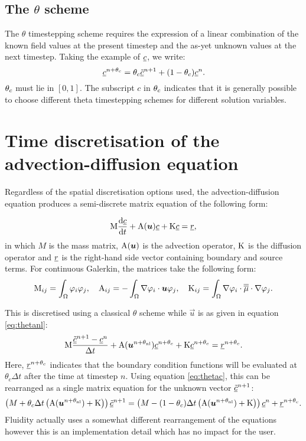 \subsection{The $\theta$ scheme}
\label{sect:ND_time_theta_scheme}

The $\theta$ timestepping scheme requires the expression of a linear
combination of the known field values at the present timestep and the as-yet
unknown values at the next timestep. Taking the example of $\underline{c}$, we write:
\begin{equation}
  \label{eq:thetac}
  \underline{c}^{n+\theta_c}=\theta_c\underline{\tilde c}^{n+1}+(1-\theta_c)\underline{c}^{n}.
\end{equation}
$\theta_c$ must lie in $[0,1]$. The subscript $c$ in $\theta_c$ indicates that it is 
generally possible to choose different theta timestepping schemes for different solution
variables.

\section{Time discretisation of the advection-diffusion equation}
\label{sect:ND_time_disct_adv_diff}

Regardless of the spatial discretisation options used, the
advection-diffusion equation produces a semi-discrete matrix equation of the
following form:

\begin{equation}
  \mathrm{M} \frac{\mathrm{d}\underline{c}}{\mathrm{d} t}+\mathrm{A}({\mbox{\boldmath$u$}})\underline{c}+\mathrm{K}\underline{c}=\underline{r},
\end{equation}
in which $M$ is the mass matrix, $\mathrm{A}({\mbox{\boldmath$u$}})$ is the advection
operator, $\mathrm{K}$ is the diffusion operator and $\underline{r}$ is the
right-hand side vector containing boundary and source terms. For continuous
Galerkin, the matrices take the following form:
\begin{equation}
  \mathrm{M}_{ij}=\int_\Omega \varphi_i\varphi_j, \quad
  \mathrm{A}_{ij}=-\int_\Omega \nabla\varphi_i\cdot{\mbox{\boldmath$u$}} \varphi_j, \quad
  \mathrm{K}_{ij}=\int_\Omega \nabla\varphi_i\cdot \overline{\overline{\mu}}\cdot\nabla \varphi_j.
\end{equation}

This is discretised using a classical $\theta$ scheme while $\vec u$ is as
given in equation \eqref{eq:thetanl}:
\begin{equation}
  \mathrm{M} \frac{\underline{\tilde c}^{n+1}-\underline{c}^{n}}{\Delta t}
  +\mathrm{A}({\mbox{\boldmath$u$}}^{n+\theta_{\mathrm{nl}}})\underline{c}^{n+\theta_c}+\mathrm{K}\underline{c}^{n+\theta_c}=\underline{r}^{n+\theta_c}.
\end{equation}
Here, $\underline{r}^{n+\theta_c}$ indicates that the boundary condition
functions will be evaluated at $\theta_c\Delta t$ after the time at timestep
$n$. Using equation \eqref{eq:thetac}, this can be rearranged as a single
matrix equation for the unknown vector $\underline{\tilde c}^{n+1}$:
\begin{equation}
  \left(M+\theta_c\Delta t\left(\mathrm{A}({\mbox{\boldmath$u$}}^{n+\theta_{\mathrm{nl}}})+\mathrm{K}\right)\right)\underline{\tilde c}^{n+1}
  =\left(M-(1-\theta_c)\Delta
    t\left(\mathrm{A}({\mbox{\boldmath$u$}}^{n+\theta_{\mathrm{nl}}})+\mathrm{K}\right)\right)\underline{c}^{n} +\underline{r}^{n+\theta_c}.
\end{equation}
Fluidity actually uses a somewhat different rearrangement of the equations
however this is an implementation detail which has no impact for the user.

